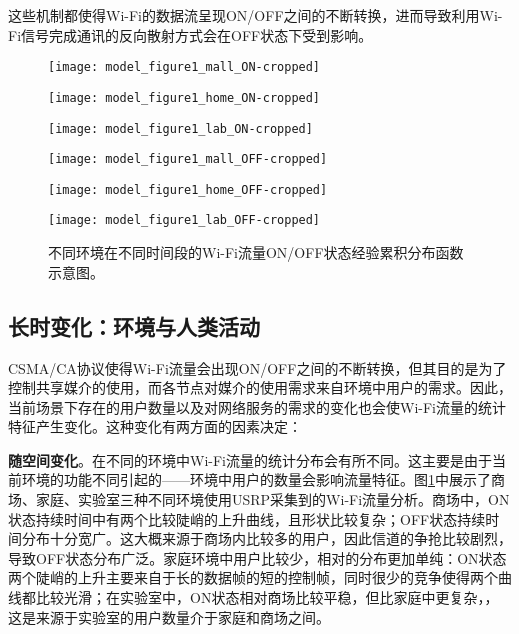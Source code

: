 这些机制都使得Wi-Fi的数据流呈现ON/OFF之间的不断转换，进而导致利用Wi-Fi信号完成通讯的反向散射方式会在OFF状态下受到影响。
\begin{figure}
	\begin{minipage}[b]{.32\linewidth}
		\texttt{[image: model\_figure1\_mall\_ON-cropped]}
		\label{fig:ecdf_mall_on}
	\end{minipage}
	\hfill
	\begin{minipage}[b]{.32\linewidth}
		\texttt{[image: model\_figure1\_home\_ON-cropped]}
		\label{fig:ecdf_home_on}
	\end{minipage}
	\hfill
	\begin{minipage}[b]{.32\linewidth}
		\texttt{[image: model\_figure1\_lab\_ON-cropped]}
		\label{fig:ecdf_lab_on}
	\end{minipage}
	
	\begin{minipage}[b]{.32\linewidth}
		\texttt{[image: model\_figure1\_mall\_OFF-cropped]}
		\label{fig:ecdf_mall_off}
	\end{minipage}
	\hfill
	\begin{minipage}[b]{.32\linewidth}
		\texttt{[image: model\_figure1\_home\_OFF-cropped]}
		\label{fig:ecdf_home_off}
	\end{minipage}
	\hfill
	\begin{minipage}[b]{.32\linewidth}
		\texttt{[image: model\_figure1\_lab\_OFF-cropped]}
		\label{fig:ecdf_lab_off}
	\end{minipage}
	\caption{不同环境在不同时间段的Wi-Fi流量ON/OFF状态经验累积分布函数示意图。}\label{fig:ecdf}
\end{figure}
\subsection{长时变化：环境与人类活动}
CSMA/CA协议使得Wi-Fi流量会出现ON/OFF之间的不断转换，但其目的是为了控制共享媒介的使用，而各节点对媒介的使用需求来自环境中用户的需求。因此，当前场景下存在的用户数量以及对网络服务的需求的变化也会使Wi-Fi流量的统计特征产生变化。这种变化有两方面的因素决定：

\textbf{随空间变化}。在不同的环境中Wi-Fi流量的统计分布会有所不同。这主要是由于当前环境的功能不同引起的——环境中用户的数量会影响流量特征。图\ref{fig:ecdf}中展示了商场、家庭、实验室三种不同环境使用USRP采集到的Wi-Fi流量分析。商场中，ON状态持续时间中有两个比较陡峭的上升曲线，且形状比较复杂；OFF状态持续时间分布十分宽广。这大概来源于商场内比较多的用户，因此信道的争抢比较剧烈，导致OFF状态分布广泛。家庭环境中用户比较少，相对的分布更加单纯：ON状态两个陡峭的上升主要来自于长的数据帧的短的控制帧，同时很少的竞争使得两个曲线都比较光滑；在实验室中，ON状态相对商场比较平稳，但比家庭中更复杂，，这是来源于实验室的用户数量介于家庭和商场之间。


